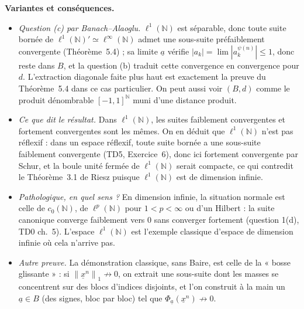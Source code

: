 \documentclass[11pt,a4paper]{article}
\newcommand{\N}{\mathbb{N}}
\newcommand{\norm}[1]{\left\|#1\right\|}
\theoremstyle{definition}
\newcommand{\su}[1]{\underline{#1}}
\newcommand{\linf}{\ell^\infty(\N)}
\newcommand{\lun}{\ell^1(\N)}
\newcommand{\cz}{c_0(\N)}
\begin{document}
\begin{commentaire}
\textbf{Variantes et conséquences.}
\begin{itemize}[leftmargin=*]
  \item \emph{Question (c) par Banach--Alaoglu.} $\lun$ est séparable, donc toute suite bornée de $\lun'\simeq\linf$ admet une sous-suite préfaiblement convergente (Théorème~5.4) ; sa limite $\su a$ vérifie $|a_k|=\lim|a^{\psi(n)}_k|\le1$, donc reste dans $B$, et la question (b) traduit cette convergence en convergence pour $d$. L'extraction diagonale faite plus haut est exactement la preuve du Théorème~5.4 dans ce cas particulier. On peut aussi voir $(B,d)$ comme le produit dénombrable $[-1,1]^\N$ muni d'une distance produit.
  \item \emph{Ce que dit le résultat.} Dans $\lun$, les suites faiblement convergentes et fortement convergentes sont les mêmes. On en déduit que $\lun$ n'est pas réflexif : dans un espace réflexif, toute suite bornée a une sous-suite faiblement convergente (TD5, Exercice~6), donc ici fortement convergente par Schur, et la boule unité fermée de $\lun$ serait compacte, ce qui contredit le Théorème~3.1 de Riesz puisque $\lun$ est de dimension infinie.
  \item \emph{Pathologique, en quel sens ?} En dimension infinie, la situation normale est celle de $\cz$, de $\ell^p(\N)$ pour $1<p<\infty$ ou d'un Hilbert : la suite canonique converge faiblement vers $0$ sans converger fortement (question 1(d), TD0 ch.~5). L'espace $\lun$ est l'exemple classique d'espace de dimension infinie où cela n'arrive pas.
  \item \emph{Autre preuve.} La démonstration classique, sans Baire, est celle de la « bosse glissante » : si $\norm{\su x^n}_1\not\to0$, on extrait une sous-suite dont les masses se concentrent sur des blocs d'indices disjoints, et l'on construit à la main un $\su a\in B$ (des signes, bloc par bloc) tel que $\Phi_{\su a}(\su x^n)\not\to0$.
\end{itemize}
\end{commentaire}
\end{document}
